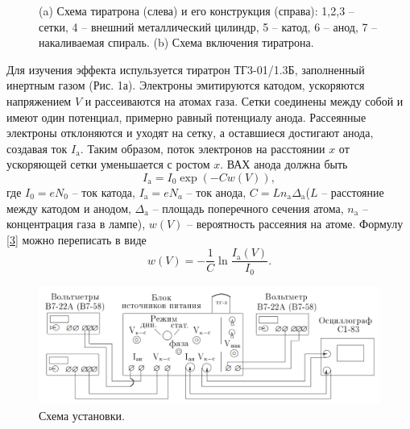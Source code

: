\documentclass[a4paper, 12pt]{article}%
\begin{document}
\begin{figure}[h]
  \centering
  \caption{(a) Схема тиратрона (слева) и его конструкция (справа): 1,2,3 -- сетки, 4 -- внешний металлический цилиндр, 5 -- катод, 6 -- анод, 7 -- накаливаемая спираль. (b) Схема включения тиратрона.}
\end{figure}
Для изучения эффекта испульзуется тиратрон ТГ3-01/1.3Б, заполненный инертным газом (Рис. 1а). Электроны эмитируются катодом, ускоряются напряжением $V$ и рассеиваются на атомах газа. Сетки соединены между собой и имеют один потенциал, примерно равный потенциалу анода. Рассеянные электроны отклоняются и уходят на сетку, а оставшиеся достигают анода, создавая ток $I_\text{a}$. Таким образом, поток электронов на расстоянии $x$ от ускоряющей сетки уменьшается с ростом $x$. ВАХ анода должна быть
\begin{equation}\label{3}
I_\text{a} = I_0 \exp\left( - C w(V) \right),
\end{equation}
где $I_0 = eN_0$ -- ток катода, $I_\text{a} = eN_a$ -- ток анода, $C = Ln_\text{a} \Delta_\text{a}$($L$ --  расстояние между катодом и анодом, $\Delta_\text{a}$ -- площадь поперечного сечения атома, $n_\text{a}$ -- концентрация газа в лампе), $w(V)$ -- вероятность рассеяния на атоме.
Формулу \eqref{3} можно переписать в виде
\[\tag{5a}\label{5a}
w(V) = -\dfrac{1}{C}\ln \dfrac{I_\text{a}(V)}{I_0}.
\]
\begin{figure}[h]
\includegraphics[scale=0.6]{img/1.png}
\centering
\caption{Схема установки.}
\end{figure}\\
\end{document}
